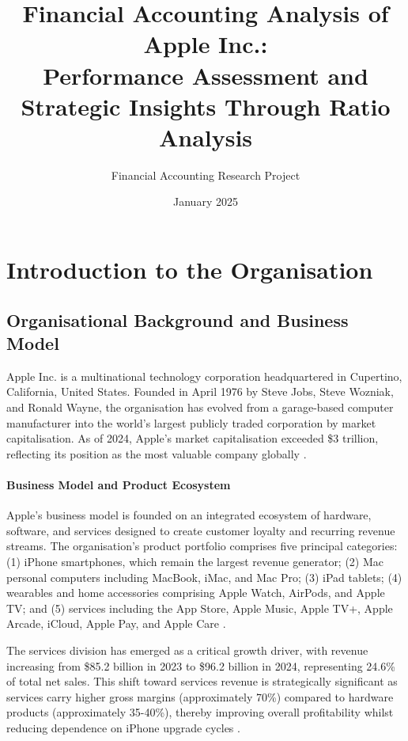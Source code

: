 \documentclass[12pt,a4paper]{article}
\title{\textbf{Financial Accounting Analysis of Apple Inc.:}\\
\textbf{Performance Assessment and Strategic Insights Through Ratio Analysis}}
\author{Financial Accounting Research Project}
\date{January 2025}
\begin{document}
\maketitle

\tableofcontents
\newpage

\section{Introduction to the Organisation}

\subsection{Organisational Background and Business Model}

Apple Inc. is a multinational technology corporation headquartered in Cupertino, California, United States. Founded in April 1976 by Steve Jobs, Steve Wozniak, and Ronald Wayne, the organisation has evolved from a garage-based computer manufacturer into the world's largest publicly traded corporation by market capitalisation. As of 2024, Apple's market capitalisation exceeded \$3 trillion, reflecting its position as the most valuable company globally \citep{apple202410k}.

\paragraph{Business Model and Product Ecosystem}

Apple's business model is founded on an integrated ecosystem of hardware, software, and services designed to create customer loyalty and recurring revenue streams. The organisation's product portfolio comprises five principal categories: (1) iPhone smartphones, which remain the largest revenue generator; (2) Mac personal computers including MacBook, iMac, and Mac Pro; (3) iPad tablets; (4) wearables and home accessories comprising Apple Watch, AirPods, and Apple TV; and (5) services including the App Store, Apple Music, Apple TV+, Apple Arcade, iCloud, Apple Pay, and Apple Care \citep{apple202410k}.

The services division has emerged as a critical growth driver, with revenue increasing from \$85.2 billion in 2023 to \$96.2 billion in 2024, representing 24.6\% of total net sales. This shift toward services revenue is strategically significant as services carry higher gross margins (approximately 70\%) compared to hardware products (approximately 35-40\%), thereby improving overall profitability whilst reducing dependence on iPhone upgrade cycles \citep{apple202410k}.
\end{document}
